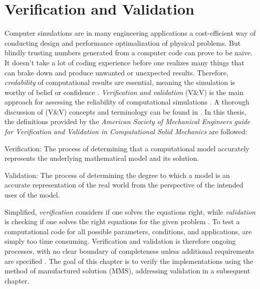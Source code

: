 \chapter{Verification and Validation}
 Computer simulations are in many engineering applications a cost-efficient way of conducting design and performance optimalization of physical problems. But blindly trusting numbers generated from a computer code can prove to be naive. It doesn't take a lot of coding experience before one realizes many things that can brake down and produce unwanted or unexpected results. 
Therefore, \textit{credability} of computational results are essential, meaning the simulation is worthy of belief or confidence \cite{Oberkampf2010}. \textit{Verification and validation} (V\&V) is the main approach for assessing the reliability of computational simulations \cite{Sommerville2006}.  A thorough discussion  of (V\&V) concepts and terminology can be found in \cite{Oberkampf2010}. In this thesis, the definitions provided by the \textit{American Society of Mechanical Engineers guide for Verification and Validation in Computational Solid Mechanics}  \cite{Schwer2006} are followed:

\begin{defn}
Verification: The process of determining that a computational model accurately represents
the underlying mathematical model and its solution. 
\end{defn}

\begin{defn}
Validation: The process of determining the degree to which a model is an accurate
representation of the real world from the perspective of the intended uses of the model. 
\label{eq:intcond}
\end{defn}

Simplified, \textit{verification} considers if one solves the equations right, while \textit{validation} is checking if one solves the right equations for the given problem \cite{Roache}. To test a computational code for all possible parameters, conditions, and applications, are simply too time consuming. Verification and validation is therefore ongoing processes, with no clear boundary of completeness unless additional requirements are specified \cite{Roache}. The goal of this chapter is to verify the implementations using the method of manufactured solution  (MMS), addressing validation in a subsequent chapter.

